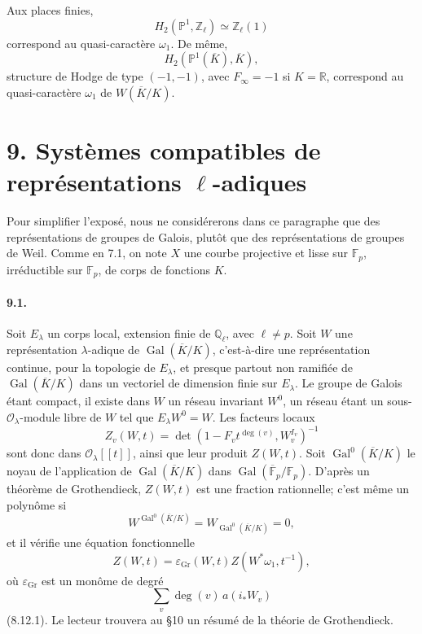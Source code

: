 \documentclass[10pt,letterpaper]{article}
\newcommand{\Q}{\mathbb Q}
\newcommand{\Z}{\mathbb Z}
\newcommand{\F}{\mathbb F}
\newcommand{\Gal}{\operatorname{Gal}}
\providecommand{\R}{\mathbb R}
\providecommand{\Gal}{\operatorname{Gal}}
\providecommand{\Gal}{\operatorname{Gal}}
\providecommand{\Gal}{\operatorname{Gal}}
\providecommand{\Gal}{\operatorname{Gal}}
\begin{document}
Aux places finies,
\[
H_2(\mathbb P^1,\Z_\ell)\simeq\Z_\ell(1)
\]
correspond au quasi-caractère $\omega_1$. De même,
\[
H_2(\mathbb P^1(\overline K),\overline K),
\]
structure de Hodge de type $(-1,-1)$, avec $F_\infty=-1$ si $K=\R$, correspond au quasi-caractère $\omega_1$ de $W(\overline K/K)$.

\section*{9. Systèmes compatibles de représentations $\ell$-adiques}

Pour simplifier l'exposé, nous ne considérerons dans ce paragraphe que des représentations de groupes de Galois, plutôt que des représentations de groupes de Weil. Comme en 7.1, on note $X$ une courbe projective et lisse sur $\F_p$, irréductible sur $\F_p$, de corps de fonctions $K$.

\paragraph{9.1.} Soit $E_\lambda$ un corps local, extension finie de $\Q_\ell$, avec $\ell\ne p$. Soit $W$ une représentation $\lambda$-adique de $\Gal(\overline K/K)$, c'est-à-dire une représentation continue, pour la topologie de $E_\lambda$, et presque partout non ramifiée de $\Gal(\overline K/K)$ dans un vectoriel de dimension finie sur $E_\lambda$. Le groupe de Galois étant compact, il existe dans $W$ un réseau invariant $W^0$, un réseau étant un sous-$\mathcal O_\lambda$-module libre de $W$ tel que $E_\lambda W^0=W$. Les facteurs locaux
\[
Z_v(W,t)=\det(1-F_vt^{\deg(v)},W_v^{I_v})^{-1}
\]
sont donc dans $\mathcal O_\lambda[[t]]$, ainsi que leur produit $Z(W,t)$. Soit $\Gal^0(\overline K/K)$ le noyau de l'application de $\Gal(\overline K/K)$ dans $\Gal(\overline{\F}_p/\F_p)$. D'après un théorème de Grothendieck, $Z(W,t)$ est une fraction rationnelle; c'est même un polynôme si
\[
W^{\Gal^0(\overline K/K)}=W_{\Gal^0(\overline K/K)}=0,
\]
et il vérifie une équation fonctionnelle
\[
\tag{9.1.1}
Z(W,t)=\varepsilon_{\mathrm{Gr}}(W,t)Z(W^*\omega_1,t^{-1}),
\]
où $\varepsilon_{\mathrm{Gr}}$ est un monôme de degré
\[
\sum_v\deg(v)\,a(i_*W_v)
\]
(8.12.1). Le lecteur trouvera au §10 un résumé de la théorie de Grothendieck.
\end{document}
